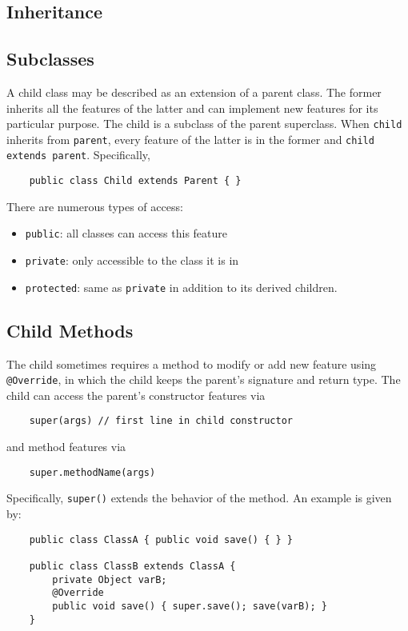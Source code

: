 \documentclass[letterpaper, openany, justified]{tufte-book}
\newcommand{\cd}[1]{\lstinline{#1}}
\begin{document}
\begin{fullwidth}
\chapter{Inheritance}

\section{Subclasses}
A child class may be described as an extension of a parent class. The former inherits all the features of the latter and can implement new features for its particular purpose. The child is a subclass of the parent superclass. When \cd{child} inherits from \cd{parent}, every feature of the latter is in the former and \cd{child extends parent}. Specifically,
\begin{lstlisting}
    public class Child extends Parent { }
\end{lstlisting}
There are numerous types of access:
\begin{itemize}
    \item \cd{public}: all classes can access this feature
    \item \cd{private}: only accessible to the class it is in
    \item \cd{protected}: same as \cd{private} in addition to its derived children.
\end{itemize}

\section{Child Methods}
The child sometimes requires a method to modify or add new feature using \cd{@Override}, in which the child keeps the parent's signature and return type. The child can access the parent's constructor features via
\begin{lstlisting}
    super(args) // first line in child constructor
\end{lstlisting}
and method features via
\begin{lstlisting}
    super.methodName(args)
\end{lstlisting}
Specifically, \cd{super()} extends the behavior of the method. An example is given by:
\begin{lstlisting}
    public class ClassA { public void save() { } }

    public class ClassB extends ClassA {
        private Object varB;
        @Override
        public void save() { super.save(); save(varB); }
    }
\end{lstlisting}


\end{fullwidth}
\end{document}
